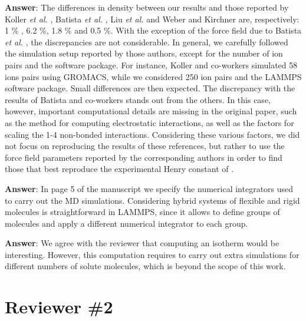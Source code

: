 \documentclass[]{article}
\begin{document}
\textbf{Answer}: The differences in density between our results and those reported by Koller \textit{et al.} \cite{Koller_2012}, Batista \textit{et al.} \cite{Batista_2015}, Liu \textit{et al.} \cite{Liu_2014} and Weber and Kirchner \cite{Weber_2016} are, respectively: 1 \% , 6.2 \%, 1.8 \% and 0.5 \%.
With the exception of the force field due to Batista \textit{et al.} \cite{Batista_2015}, the discrepancies are not considerable.
In general, we carefully followed the simulation setup reported by those authors, except for the number of ion pairs and the software package. For instance, Koller and co-workers \cite{Koller_2012} simulated 58 ions pairs using GROMACS, while we considered 250 ion pairs and the LAMMPS software package.
Small differences are then expected.
The discrepancy with the results of Batista and co-workers \cite{Batista_2015} stands out  from the others. In this case, however, important computational details are missing in the original paper, such as the method for computing electrostatic interactions, as well as the factors for scaling the 1-4 non-bonded interactions. 
Considering these various factors, we did not focus on reproducing the results of these references, but rather to use the force field parameters reported by the corresponding authors in order to find those that best reproduce the experimental Henry constant of .

{\color{blue}{4) Simulating hybrid systems that include both rigid and non rigid bodies is complex and tricky. The authors should describe in detail how they performed these simulations in terms of barostatting and thermostatting.}}

\textbf{Answer}: In page 5 of the manuscript we specify the numerical integrators used to carry out the MD simulations. Considering hybrid systems of flexible and rigid molecules is straightforward in LAMMPS, since it allows to define groups of molecules and apply a different numerical integrator to each group.

{\color{blue}{5)It would be interesting if at least for the case of CO2 an isotherm was calculated and included in the paper.}}

\textbf{Answer}: We agree with the reviewer that computing an isotherm would be interesting. However, this computation requires to carry out extra simulations for different numbers of solute molecules, which is beyond the scope of this work.

\section{\textbf{Reviewer \#2}}
\end{document}
